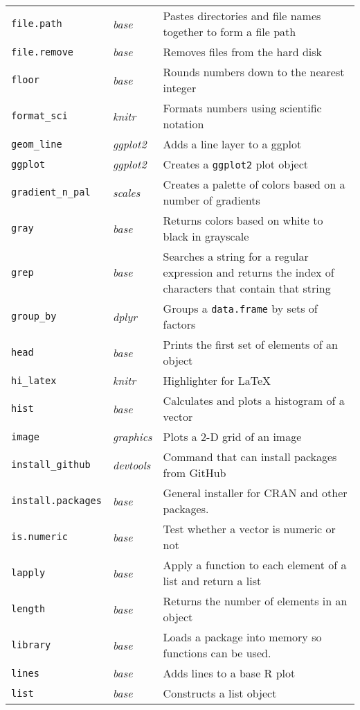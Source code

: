 \documentclass[10pt]{article}
\newcommand{\code}[1]{\texttt{#1}}
\newcommand{\pkg}[1]{\emph{#1}}
\begin{document}
\begin{longtable}{p{1.5in}p{1in}p{5in}}
\code{file.path} & \pkg{base} & Pastes directories and file names together to form a file path \\
\code{file.remove} & \pkg{base} & Removes files from the hard disk \\
\code{floor} & \pkg{base} & Rounds numbers down to the nearest integer \\
\code{format\_sci} & \pkg{knitr} & Formats numbers using scientific notation \\
\code{geom\_line} & \pkg{ggplot2} & Adds a line layer to a ggplot \\
\code{ggplot} & \pkg{ggplot2} & Creates a \code{ggplot2} plot object \\
\code{gradient\_n\_pal} & \pkg{scales} & Creates a palette of colors based on a number of gradients \\
\code{gray} & \pkg{base} & Returns colors based on white to black in grayscale \\
\code{grep} & \pkg{base} & Searches a string for a regular expression and returns the index of characters that contain that string  \\
\code{group\_by} & \pkg{dplyr} & Groups a \code{data.frame} by sets of factors \\
\code{head} & \pkg{base} & Prints the first set of elements of an object\\
\code{hi\_latex} & \pkg{knitr} & Highlighter for LaTeX\\
\code{hist} & \pkg{base} & Calculates and plots a histogram of a vector\\
\code{image} & \pkg{graphics} & Plots a 2-D grid of an image\\
\code{install\_github} & \pkg{devtools} & Command that can install packages from GitHub \\
\code{install.packages} & \pkg{base} & General installer for CRAN and other packages. \\
\code{is.numeric} & \pkg{base} & Test whether a vector is numeric or not\\
\code{lapply} & \pkg{base} & Apply a function to each element of a list and return a list \\
\code{length} & \pkg{base} & Returns the number of elements in an object\\
\code{library} & \pkg{base} & Loads a package into memory so functions can be used. \\
\code{lines} & \pkg{base} & Adds lines to a base R plot \\
\code{list} & \pkg{base} & Constructs a list object \\

\end{longtable}
\end{document}
